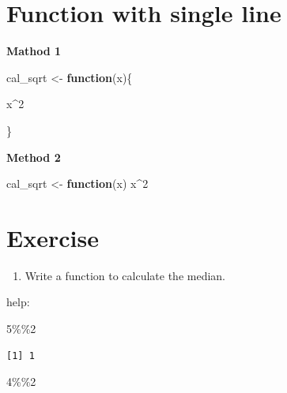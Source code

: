 \documentclass[
  letterpaper,
  DIV=11,
  numbers=noendperiod]{scrreprt}
\newenvironment{Shaded}{\begin{snugshade}}{\end{snugshade}}
\newcommand{\ControlFlowTok}[1]{\textcolor[rgb]{0.00,0.23,0.31}{\textbf{#1}}}
\newcommand{\DecValTok}[1]{\textcolor[rgb]{0.68,0.00,0.00}{#1}}
\newcommand{\NormalTok}[1]{\textcolor[rgb]{0.00,0.23,0.31}{#1}}
\newcommand{\OtherTok}[1]{\textcolor[rgb]{0.00,0.23,0.31}{#1}}
\newcommand{\SpecialCharTok}[1]{\textcolor[rgb]{0.37,0.37,0.37}{#1}}
\providecommand{\tightlist}{%
  \setlength{\itemsep}{0pt}\setlength{\parskip}{0pt}}\usepackage{longtable,booktabs,array}
\begin{document}
\section{Function with single line}\label{function-with-single-line}

\textbf{Mathod 1}

\begin{Shaded}
\begin{Highlighting}[]
\NormalTok{cal\_sqrt }\OtherTok{\textless{}{-}} \ControlFlowTok{function}\NormalTok{(x)\{}

\NormalTok{x}\SpecialCharTok{\^{}}\DecValTok{2}

\NormalTok{\}}
\end{Highlighting}
\end{Shaded}

\textbf{Method 2}

\begin{Shaded}
\begin{Highlighting}[]
\NormalTok{cal\_sqrt }\OtherTok{\textless{}{-}} \ControlFlowTok{function}\NormalTok{(x) x}\SpecialCharTok{\^{}}\DecValTok{2}
\end{Highlighting}
\end{Shaded}

\section{Exercise}\label{exercise-8}

\begin{enumerate}
\def\labelenumi{\arabic{enumi}.}
\tightlist
\item
  Write a function to calculate the median.
\end{enumerate}

help:

\begin{Shaded}
\begin{Highlighting}[]
\DecValTok{5}\SpecialCharTok{\%\%}\DecValTok{2}
\end{Highlighting}
\end{Shaded}

\begin{verbatim}
[1] 1
\end{verbatim}

\begin{Shaded}
\begin{Highlighting}[]
\DecValTok{4}\SpecialCharTok{\%\%}\DecValTok{2}
\end{Highlighting}
\end{Shaded}
\end{document}
